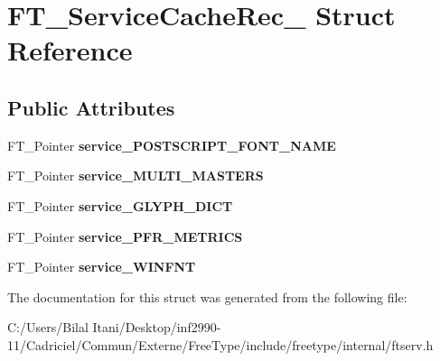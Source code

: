 \hypertarget{struct_f_t___service_cache_rec__}{}\section{F\+T\+\_\+\+Service\+Cache\+Rec\+\_\+ Struct Reference}
\label{struct_f_t___service_cache_rec__}
\subsection*{Public Attributes}
\begin{DoxyCompactItemize}
\item 
F\+T\+\_\+\+Pointer {\bfseries service\+\_\+\+P\+O\+S\+T\+S\+C\+R\+I\+P\+T\+\_\+\+F\+O\+N\+T\+\_\+\+N\+A\+ME}\hypertarget{struct_f_t___service_cache_rec___a1b95ee574621c8b031fe239d449bfa5c}{}\label{struct_f_t___service_cache_rec___a1b95ee574621c8b031fe239d449bfa5c}

\item 
F\+T\+\_\+\+Pointer {\bfseries service\+\_\+\+M\+U\+L\+T\+I\+\_\+\+M\+A\+S\+T\+E\+RS}\hypertarget{struct_f_t___service_cache_rec___abf51ac75b59eeac29ad5e4bbbc50e749}{}\label{struct_f_t___service_cache_rec___abf51ac75b59eeac29ad5e4bbbc50e749}

\item 
F\+T\+\_\+\+Pointer {\bfseries service\+\_\+\+G\+L\+Y\+P\+H\+\_\+\+D\+I\+CT}\hypertarget{struct_f_t___service_cache_rec___af8bbf442f497ad21666069ec33aaa88a}{}\label{struct_f_t___service_cache_rec___af8bbf442f497ad21666069ec33aaa88a}

\item 
F\+T\+\_\+\+Pointer {\bfseries service\+\_\+\+P\+F\+R\+\_\+\+M\+E\+T\+R\+I\+CS}\hypertarget{struct_f_t___service_cache_rec___ac5d029d7f442e8b727c40d5a88faa344}{}\label{struct_f_t___service_cache_rec___ac5d029d7f442e8b727c40d5a88faa344}

\item 
F\+T\+\_\+\+Pointer {\bfseries service\+\_\+\+W\+I\+N\+F\+NT}\hypertarget{struct_f_t___service_cache_rec___abb824452cfb20932fbd22405323781f9}{}\label{struct_f_t___service_cache_rec___abb824452cfb20932fbd22405323781f9}

\end{DoxyCompactItemize}


The documentation for this struct was generated from the following file\+:\begin{DoxyCompactItemize}
\item 
C\+:/\+Users/\+Bilal Itani/\+Desktop/inf2990-\/11/\+Cadriciel/\+Commun/\+Externe/\+Free\+Type/include/freetype/internal/ftserv.\+h\end{DoxyCompactItemize}
